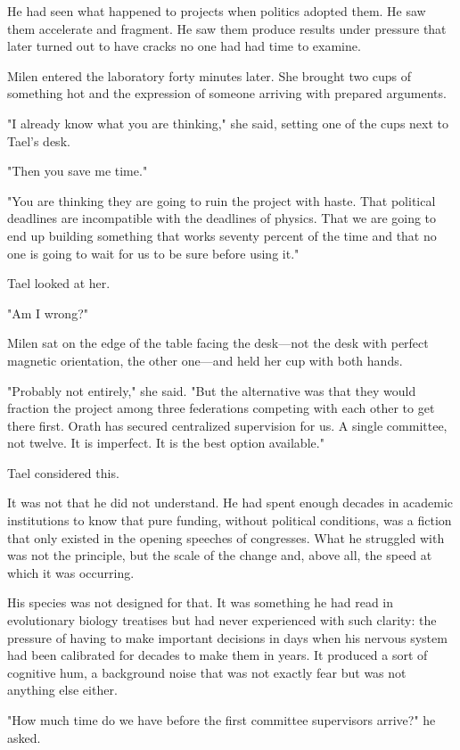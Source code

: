 \documentclass[11pt,a5paper,twoside]{book}
\begin{document}
He had seen what happened to projects when politics adopted them. He saw them accelerate and fragment. He saw them produce results under pressure that later turned out to have cracks no one had had time to examine.

Milen entered the laboratory forty minutes later. She brought two cups of something hot and the expression of someone arriving with prepared arguments.

"I already know what you are thinking," she said, setting one of the cups next to Tael's desk.

"Then you save me time."

"You are thinking they are going to ruin the project with haste. That political deadlines are incompatible with the deadlines of physics. That we are going to end up building something that works seventy percent of the time and that no one is going to wait for us to be sure before using it."

Tael looked at her.

"Am I wrong?"

Milen sat on the edge of the table facing the desk—not the desk with perfect magnetic orientation, the other one—and held her cup with both hands.

"Probably not entirely," she said. "But the alternative was that they would fraction the project among three federations competing with each other to get there first. Orath has secured centralized supervision for us. A single committee, not twelve. It is imperfect. It is the best option available."

Tael considered this.

It was not that he did not understand. He had spent enough decades in academic institutions to know that pure funding, without political conditions, was a fiction that only existed in the opening speeches of congresses. What he struggled with was not the principle, but the scale of the change and, above all, the speed at which it was occurring.

His species was not designed for that. It was something he had read in evolutionary biology treatises but had never experienced with such clarity: the pressure of having to make important decisions in days when his nervous system had been calibrated for decades to make them in years. It produced a sort of cognitive hum, a background noise that was not exactly fear but was not anything else either.

"How much time do we have before the first committee supervisors arrive?" he asked.
\end{document}
